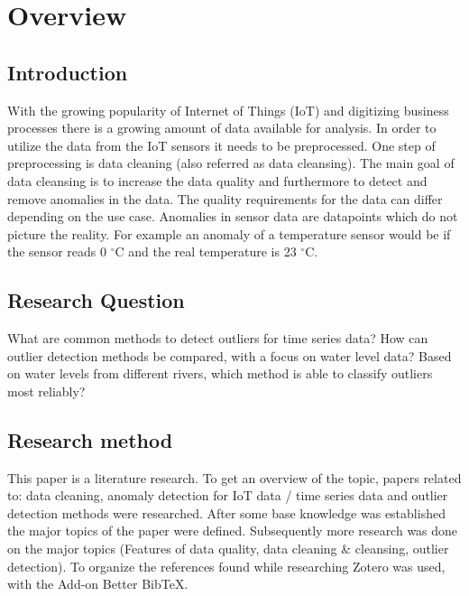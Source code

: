\chapter{Overview}

\section{Introduction}\label{section:introduction}
With the growing popularity of Internet of Things (\ac{IoT}) and digitizing business processes there is a growing amount of data available for analysis.
In order to utilize the data from the IoT sensors it needs to be preprocessed. One step of preprocessing is data cleaning (also referred as data cleansing).
The main goal of data cleansing is to increase the data quality and furthermore to detect and remove anomalies in the data. The quality requirements for the data can differ depending on the use case. Anomalies in sensor data are datapoints which do not picture the reality. For example an anomaly of a temperature sensor would be if the sensor reads 0 $^{\circ}$C and the real temperature is 23 $^{\circ}$C.

\section{Research Question}
What are common methods to detect outliers for time series data? \newline
How can outlier detection methods be compared, with a focus on water level data? \newline
Based on water levels from different rivers, which method is able to classify outliers most reliably?


\section{Research method}
This paper is a literature research. To get an overview of the topic, papers related to: data cleaning, anomaly detection for IoT data / time series data and outlier detection methods were researched. After some base knowledge was established the major topics of the paper were defined. Subsequently more research was done on the major topics (Features of data quality, data cleaning \& cleansing, outlier detection). To organize the references found while researching Zotero was used, with the Add-on Better BibTeX. 
